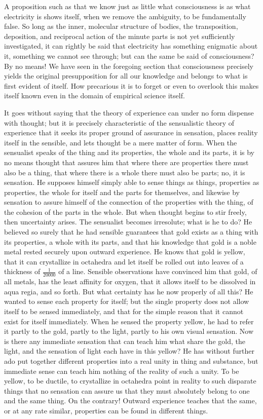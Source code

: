 \documentclass[12pt]{book}
\begin{document}
A proposition such as that we know just as little what consciousness is as
what electricity is shows itself, when we remove the ambiguity, to be
fundamentally false. So long as the inner, molecular structure of bodies, the
transposition, deposition, and reciprocal action of the minute parts is not
yet sufficiently investigated, it can rightly be said that electricity has
something enigmatic about it, something we cannot see through; but can the
same be said of consciousness? By no means! We have seen in the foregoing
section that consciousness precisely yields the original presupposition for
all our knowledge and belongs to what is first evident of itself. How
precarious it is to forget or even to overlook this makes itself known even in
the domain of empirical science itself.

It goes without saying that the theory of experience can under no form dispense
with thought; but it is precisely characteristic of the sensualistic theory of
experience that it seeks its proper ground of assurance in sensation, places
reality itself in the sensible, and lets thought be a mere matter of form. When
the sensualist speaks of the thing and its properties, the whole and its
parts, it is by no means thought that assures him that where there are
properties there must also be a thing, that where there is a whole there must
also be parts; no, it is sensation. He supposes himself simply able to sense
things as things, properties as properties, the whole for itself and the
parts for themselves, and likewise by sensation to assure himself of the
connection of the properties with the thing, of the cohesion of the parts in
the whole. But when thought begins to stir freely, then uncertainty arises.
The sensualist becomes irresolute; what is he to do? He believed so surely
that he had sensible guarantees that gold exists as a thing with its
properties, a whole with its parts, and that his knowledge that gold is a
noble metal rested securely upon outward experience. He knows that gold is
yellow, that it can crystallize in octahedra and let itself be rolled out into
leaves of a thickness of $\frac{1}{20000}$ of a line. Sensible observations
have convinced him that gold, of all metals, has the least affinity for
oxygen, that it allows itself to be dissolved in aqua regia, and so forth. But
what certainty has he now properly of all this? He wanted to sense each
property for itself; but the single property does not allow itself to be
sensed immediately, and that for the simple reason that it cannot exist for
itself immediately. When he sensed the property yellow, he had to refer it
partly to the gold, partly to the light, partly to his own visual sensation.
Now is there any immediate sensation that can teach him what share the gold,
the light, and the sensation of light each have in this yellow? He has without
further ado put together different properties into a real unity in thing and
substance, but immediate sense can teach him nothing of the reality of such a
unity. To be yellow, to be ductile, to crystallize in octahedra point in
reality to such disparate things that no sensation can assure us that they
must absolutely belong to one and the same thing. On the contrary! Outward
experience teaches that the same, or at any rate similar, properties can be
found in different things.
\end{document}
